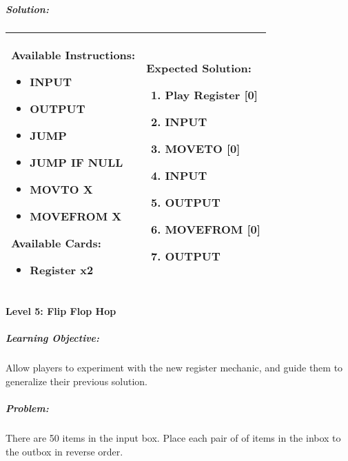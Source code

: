 \subparagraph{Solution:} 
\begin{center}
    \begin{tabular}{ | m{5cm} | m{9cm} | } 
        \hline
            \textbf{Available Instructions:} 
            \begin{itemize}
                \setlength\itemsep{-.35em}
                \item INPUT
                \item OUTPUT
                \item JUMP
                \item JUMP IF NULL
                \item MOVTO X
                \item MOVEFROM X
            \end{itemize}
            \textbf{Available Cards:} 
            \begin{itemize}
                \setlength\itemsep{-.35em}
                \item Register x2
            \end{itemize}& 
            \textbf{Expected Solution:} 
            \begin{enumerate}
                \setlength\itemsep{-.35em}
                \item Play Register [0]
                \item INPUT
                \item MOVETO [0]
                \item INPUT
                \item OUTPUT
                \item MOVEFROM [0] 
                \item OUTPUT
            \end{enumerate}
            \\
        \hline
    \end{tabular}
\end{center}

\paragraph{Level 5: Flip Flop Hop}
\subparagraph{Learning Objective:} Allow players to experiment with the new register mechanic, and guide them to generalize their previous solution.

\subparagraph{Problem:} There are 50 items in the input box. Place each pair of of items in the inbox to the outbox in reverse order.

